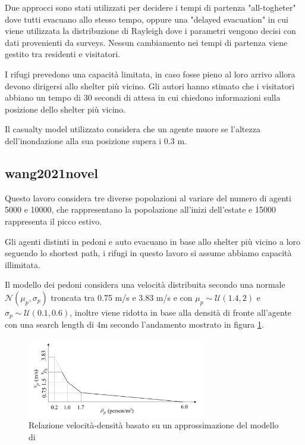 \vspace*{5mm}

Due approcci sono stati utilizzati per decidere i tempi di partenza "all-togheter" dove tutti evacuano allo stesso tempo,
oppure una "delayed evacuation" in cui viene utilizzata la distribuzione di Rayleigh dove i parametri vengono decisi con dati provenienti da surveys.
Nessun cambiamento nei tempi di partenza viene gestito tra residenti e visitatori.

\vspace*{5mm}

I rifugi prevedono una capacità limitata, in caso fosse pieno al loro arrivo allora devono dirigersi allo shelter più vicino.
Gli autori hanno stimato che i visitatori abbiano un tempo di 30 secondi di attesa in cui chiedono informazioni sulla posizione dello shelter più vicino.

\vspace*{5mm}

Il casualty model utilizzato considera che un agente muore se l'altezza dell'inondazione alla sua posizione supera i 0.3 m.



\subsection{wang2021novel}

Questo lavoro considera tre diverse popolazioni al variare del numero di agenti 5000 e 10000,
che rappresentano la popolazione all'inizi dell'estate e 15000 rappresenta il picco estivo.

\vspace*{5mm}

Gli agenti distinti in pedoni e auto evacuano in base allo shelter più vicino a loro seguendo lo shortest path,
i rifugi in questo lavoro si assume abbiamo capacità illimitata.

\vspace*{5mm}

Il modello dei pedoni considera una velocità distribuita secondo una normale $\mathcal{N}(\mu_p,\sigma_p)$ troncata tra 0.75 m/s e 3.83 m/s e
con $\mu_p \sim \mathcal{U}(1.4, 2)$ e $\sigma_p \sim \mathcal{U}(0.1, 0.6)$, 
inoltre viene ridotta in base alla densità di fronte all'agente con una search length di 4m secondo l'andamento mostrato in figura \ref*{fig:dadknakdand}.

\begin{figure}[ht]
    \centering
    \includegraphics[width=0.7\textwidth]{images/speed_WANG.png}
    \caption{Relazione velocità-densità \textcite[]{wang2021novel} basato su un approssimazione del modello di \textcite[]{goto2012tsunami}}
    \label{fig:dadknakdand}
\end{figure}


